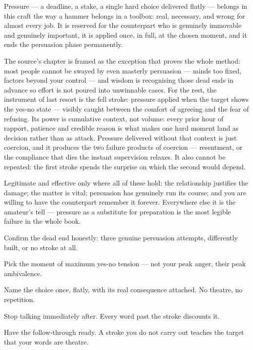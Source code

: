 \begin{core}
Pressure --- a deadline, a stake, a single hard choice delivered flatly --- belongs in this craft the way a hammer belongs in a toolbox: real, necessary, and wrong for almost every job. It is reserved for the counterpart who is genuinely immovable and genuinely important, it is applied once, in full, at the chosen moment, and it ends the persuasion phase permanently.
\end{core}
\begin{mechanism}
The source's chapter is framed as the exception that proves the whole method: most people cannot be swayed by even masterly persuasion --- minds too fixed, factors beyond your control --- and wisdom is recognising those dead ends in advance so effort is not poured into unwinnable cases. For the rest, the instrument of last resort is the fell stroke: pressure applied when the target shows the yes-no state --- visibly caught between the comfort of agreeing and the fear of refusing. Its power is cumulative context, not volume: every prior hour of rapport, patience and credible reason is what makes one hard moment land as decision rather than as attack. Pressure delivered without that context is just coercion, and it produces the two failure products of coercion --- resentment, or the compliance that dies the instant supervision relaxes. It also cannot be repeated: the first stroke spends the surprise on which the second would depend.
\end{mechanism}
\begin{conditions}
Legitimate and effective only where all of these hold: the relationship justifies the damage; the matter is vital; persuasion has genuinely run its course; and you are willing to have the counterpart remember it forever. Everywhere else it is the amateur's tell --- pressure as a substitute for preparation is the most legible failure in the whole book.
\end{conditions}
\begin{application}
  \item Confirm the dead end honestly: three genuine persuasion attempts, differently built, or no stroke at all.
  \item Pick the moment of maximum yes-no tension --- not your peak anger, their peak ambivalence.
  \item Name the choice once, flatly, with its real consequence attached. No theatre, no repetition.
  \item Stop talking immediately after. Every word past the stroke discounts it.
  \item Have the follow-through ready. A stroke you do not carry out teaches the target that your words are theatre.
\end{application}

